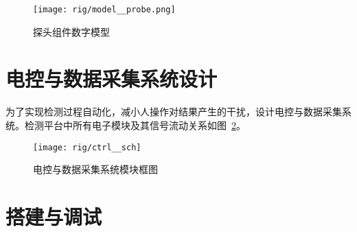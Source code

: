 
\begin{figure}[tbhp]
\centering
\texttt{[image: rig/model\_\_probe.png]}
\caption{探头组件数字模型}
\label{fig:rig-model-probe}
\end{figure}



\clearpage



\section{电控与数据采集系统设计}\label{sec:rig-ctrl}

为了实现检测过程自动化，减小人操作对结果产生的干扰，设计电控与数据采集系统。检测平台中所有电子模块及其信号流动关系如图~\ref{fig:rig-ctrl-sch}。

\begin{figure}[tbhp]
\centering
\texttt{[image: rig/ctrl\_\_sch]}
\caption[电控系统框图]{电控与数据采集系统模块框图}
\label{fig:rig-ctrl-sch}
\end{figure}




\section{搭建与调试}\label{sec:rig-build}